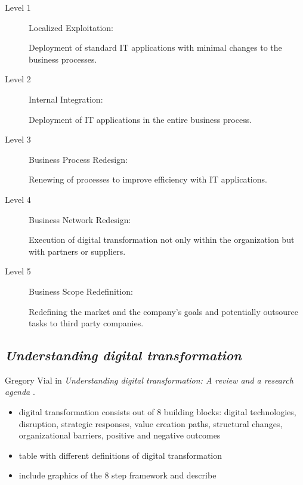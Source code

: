 \documentclass[a4]{scrartcl}
\begin{document}
\begin{description}
	\item[Level 1] Localized Exploitation: 
	
	Deployment of standard IT applications with minimal changes to the business processes.
	
	\item[Level 2] Internal Integration: 
	
	Deployment of IT applications in the entire business process.
	
	\item[Level 3] Business Process Redesign: 
	
	Renewing of processes to improve efficiency with IT applications.
	
	\item[Level 4] Business Network Redesign: 
	
	Execution of digital transformation not only within the organization but with partners or suppliers.
	
	\item[Level 5] Business Scope Redefinition: 
	
	Redefining the market and the company's goals and potentially outsource tasks to third party companies.
	
\end{description}


	
	
	
	
	
	
	
\subsection{\textit{Understanding digital transformation}} \label{vial}	
	
Gregory Vial in \textit{Understanding digital transformation: A review and a research agenda} \cite{vial}.

\begin{itemize}
	\item digital transformation consists out of 8 building blocks: digital technologies, disruption, strategic responses, value creation paths, structural changes, organizational barriers, positive and negative outcomes
	\item table with different definitions of digital transformation
	\item include graphics of the 8 step framework and describe
\end{itemize}
	
\end{document}
